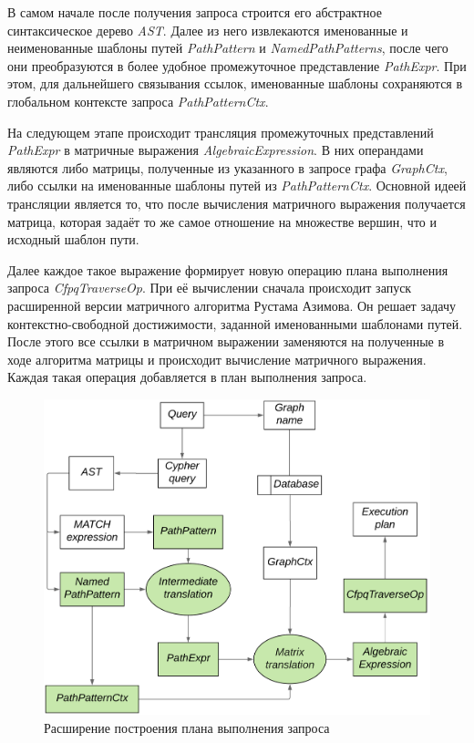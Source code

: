 В самом начале после получения запроса строится его абстрактное синтаксическое дерево \textit{AST}. Далее из него извлекаются именованные и неименованные шаблоны путей \textit{PathPattern} и \textit{NamedPathPatterns}, после чего они преобразуются в более удобное промежуточное представление \textit{PathExpr}. При этом, для дальнейшего связывания ссылок, именованные шаблоны сохраняются в глобальном контексте запроса \textit{PathPatternCtx}.

На следующем этапе происходит трансляция промежуточных представлений \textit{PathExpr} в матричные выражения \textit{AlgebraicExpression}. В них операндами являются либо матрицы, полученные из указанного в запросе графа \textit{GraphCtx}, либо ссылки на именованные шаблоны путей из \textit{PathPatternCtx}. Основной идеей трансляции является то, что после вычисления матричного выражения получается матрица, которая задаёт то же самое отношение на множестве вершин, что и исходный шаблон пути.

Далее каждое такое выражение формирует новую операцию плана выполнения запроса \textit{CfpqTraverseOp}. При её вычислении сначала происходит запуск расширенной версии матричного алгоритма Рустама Азимова. Он решает задачу контекстно-свободной достижимости, заданной именованными шаблонами путей. После этого все ссылки в матричном выражении заменяются на полученные в ходе алгоритма матрицы и происходит вычисление матричного выражения. Каждая такая операция добавляется в план выполнения запроса.


\begin{figure}[H]
\centering
    \includegraphics[width=1.0\linewidth]{Terekhov/pictures/execution_plan_3.png}
    \caption{Расширение построения плана выполнения запроса}
    \label{fig:execution_plan}
\end{figure}

